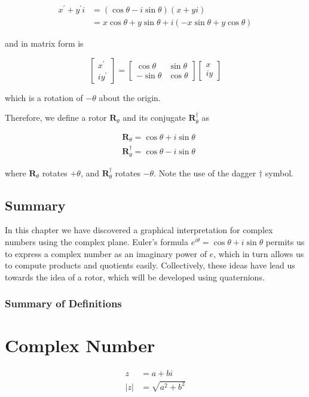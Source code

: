 \documentclass[10pt]{article}
\begin{document}
$$
\begin{aligned}
x^{\prime}+y^{\prime} i & =(\cos \theta-i \sin \theta)(x+y i) \\
& =x \cos \theta+y \sin \theta+i(-x \sin \theta+y \cos \theta)
\end{aligned}
$$

and in matrix form is

$$
\left[\begin{array}{r}
x^{\prime} \\
i y^{\prime}
\end{array}\right]=\left[\begin{array}{rr}
\cos \theta & \sin \theta \\
-\sin \theta & \cos \theta
\end{array}\right]\left[\begin{array}{c}
x \\
i y
\end{array}\right]
$$

which is a rotation of $-\theta$ about the origin.

Therefore, we define a rotor $\mathbf{R}_{\theta}$ and its conjugate $\mathbf{R}_{\theta}^{\dagger}$ as

$$
\begin{aligned}
& \mathbf{R}_{\theta}=\cos \theta+i \sin \theta \\
& \mathbf{R}_{\theta}^{\dagger}=\cos \theta-i \sin \theta
\end{aligned}
$$

where $\mathbf{R}_{\theta}$ rotates $+\theta$, and $\mathbf{R}_{\theta}^{\dagger}$ rotates $-\theta$. Note the use of the dagger $\dagger$ symbol.

\subsection{Summary}
In this chapter we have discovered a graphical interpretation for complex numbers using the complex plane. Euler's formula $e^{i \theta}=\cos \theta+i \sin \theta$ permits us to express a complex number as an imaginary power of $e$, which in turn allows us to compute products and quotients easily. Collectively, these ideas have lead us towards the idea of a rotor, which will be developed using quaternions.

\subsubsection{Summary of Definitions}
\section{Complex Number}
$$
\begin{aligned}
z & =a+b i \\
|z| & =\sqrt{a^{2}+b^{2}}
\end{aligned}
$$
\end{document}
